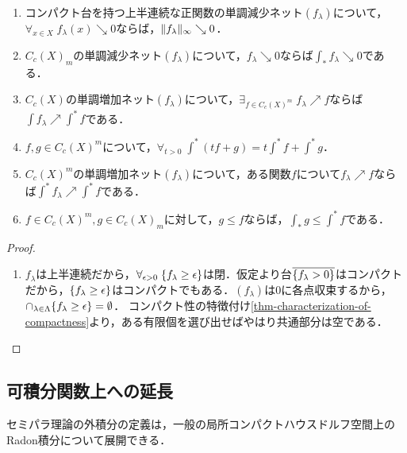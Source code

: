 \documentclass[uplatex,dvipdfmx]{jsreport}
\begin{document}
\begin{lemma}\mbox{}
    \begin{enumerate}
        \item コンパクト台を持つ上半連続な正関数の単調減少ネット$(f_\lambda)$について，$\forall_{x\in X}\;f_\lambda(x)\searrow 0$ならば，$\|f_\lambda\|_\infty\searrow0$．
        \item $C_c(X)_m$の単調減少ネット$(f_\lambda)$について，$f_\lambda\searrow0$ならば$\int_*f_\lambda\searrow0$である．
        \item $C_c(X)$の単調増加ネット$(f_\lambda)$について，$\exists_{f\in C_c(X)^m}\;f_\lambda\nearrow f$ならば$\int f_\lambda\nearrow\int^*f$である．
        \item $f,g\in C_c(X)^m$について，$\forall_{t>0}\;\int^*(tf+g)=t\int^*f+\int^*g$．
        \item $C_c(X)^m$の単調増加ネット$(f_\lambda)$について，ある関数$f$について$f_\lambda\nearrow f$ならば$\int^*f_\lambda\nearrow\int^*f$である．
        \item $f\in C_c(X)^m,g\in C_c(X)_m$に対して，$g\le f$ならば，$\int_*g\le\int^*f$である．
    \end{enumerate}
\end{lemma}
\begin{proof}\mbox{}
    \begin{enumerate}
        \item $f_\lambda$は上半連続だから，$\forall_{\epsilon>0}\;\{f_\lambda\ge\epsilon\}$は閉．仮定より台$\overline{\left\{f_\lambda>0\right\}}$はコンパクトだから，$\{f_\lambda\ge\epsilon\}$はコンパクトでもある．$(f_\lambda)$は$0$に各点収束するから，$\cap_{\lambda\in\Lambda}\{f_\lambda\ge\epsilon\}=\emptyset$．
        コンパクト性の特徴付け\ref{thm-characterization-of-compactness}より，ある有限個を選び出せばやはり共通部分は空である．
    \end{enumerate}
\end{proof}

\subsection{可積分関数上への延長}

\begin{tcolorbox}[colframe=ForestGreen, colback=ForestGreen!10!white,breakable,colbacktitle=ForestGreen!40!white,coltitle=black,fonttitle=\bfseries\sffamily,
title=]
    セミパラ理論の外積分の定義は，一般の局所コンパクトハウスドルフ空間上のRadon積分について展開できる．
\end{tcolorbox}
\end{document}
